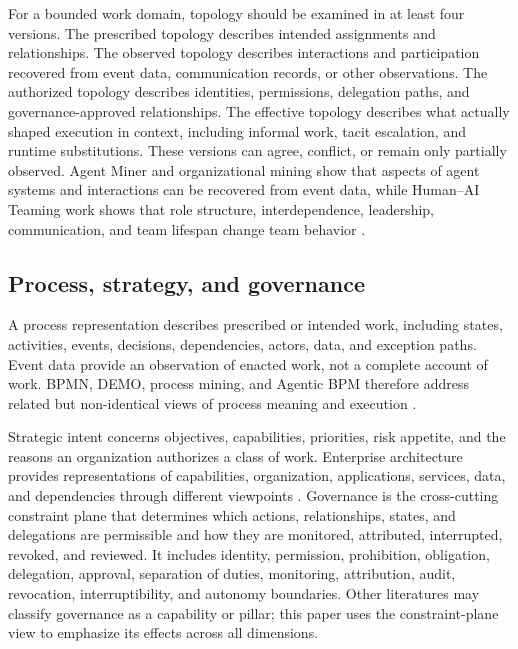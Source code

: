 \documentclass[11pt,letterpaper]{article}
\newcommand{\parencite}[1]{\citep{#1}}
\begin{document}
For a bounded work domain, topology should be examined in at least four versions. The prescribed topology describes intended assignments and relationships. The observed topology describes interactions and participation recovered from event data, communication records, or other observations. The authorized topology describes identities, permissions, delegation paths, and governance-approved relationships. The effective topology describes what actually shaped execution in context, including informal work, tacit escalation, and runtime substitutions. These versions can agree, conflict, or remain only partially observed. Agent Miner and organizational mining show that aspects of agent systems and interactions can be recovered from event data, while Human--AI Teaming work shows that role structure, interdependence, leadership, communication, and team lifespan change team behavior \parencite{tour2023agentminer,orgmining2026,verhagen2024trust,hughes2026teams}.

\subsection{Process, strategy, and governance}
A process representation describes prescribed or intended work, including states, activities, events, decisions, dependencies, actors, data, and exception paths. Event data provide an observation of enacted work, not a complete account of work. BPMN, DEMO, process mining, and Agentic BPM therefore address related but non-identical views of process meaning and execution \parencite{dietz2006enterprise,omg2014bpmn,aalst2016process,dumas2023abpms}.

Strategic intent concerns objectives, capabilities, priorities, risk appetite, and the reasons an organization authorizes a class of work. Enterprise architecture provides representations of capabilities, organization, applications, services, data, and dependencies through different viewpoints \parencite{zachman1987framework,togaf2022standard,archimate2022standard}. Governance is the cross-cutting constraint plane that determines which actions, relationships, states, and delegations are permissible and how they are monitored, attributed, interrupted, revoked, and reviewed. It includes identity, permission, prohibition, obligation, delegation, approval, separation of duties, monitoring, attribution, audit, revocation, interruptibility, and autonomy boundaries. Other literatures may classify governance as a capability or pillar; this paper uses the constraint-plane view to emphasize its effects across all dimensions.
\end{document}
